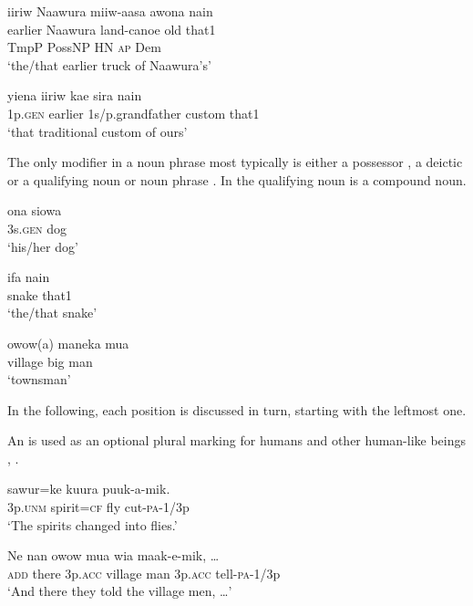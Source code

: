  

\ea%
\label{ex:4:x393}
\glll iiriw  Naawura  miiw-aasa  awona  nain \\
 earlier  Naawura  land-canoe  old  that1     \\
TmpP  PossNP  HN  \textsc{ap}  Dem\\
\glt`the/that earlier truck of Naawura's'
\z

\ea%
\label{ex:4:x394}
\gll yiena  iiriw  kae  sira  nain \\
   1p.\textsc{gen}  earlier  1s/p.grandfather  custom  that1   \\
\glt`that traditional custom of ours'
\z

The only modifier in a noun phrase most typically is either a possessor , a deictic  or a qualifying noun or noun phrase . In  the qualifying noun is a compound noun.

\ea%
\label{ex:4:x395}
\gll ona  siowa \\
 3s.\textsc{gen}  dog     \\
\glt`his/her dog'

\z

\ea%
\label{ex:4:x396}
\gll ifa  nain \\
 snake  that1     \\
\glt`the/that snake'
\z

\ea%
\label{ex:4:x397}
\gll owow(a)  maneka  mua \\
 village  big  man     \\
\glt`townsman'
\z

In the following, each  position is discussed in turn, starting with the leftmost one.  

An  is used as an optional plural marking for humans and other human-like beings , . 

\ea%
\label{ex:4:x398}
\gll {}  sawur=ke  kuura  puuk-a-mik. \\
   3p.\textsc{unm}  spirit=\textsc{cf}  fly  cut-\textsc{pa}-1/3p   \\
\glt`The spirits changed into flies.'
\z

\ea%
\label{ex:4:x1831}
\gll Ne  nan    owow  mua  wia  maak-e-mik,  {\dots} \\
  \textsc{add}  there  3p.\textsc{acc}  village  man  3p.\textsc{acc}  tell-\textsc{pa}-1/3p    \\
\glt`And there they told the village men, {\dots}'
\z

